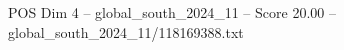 \begin{textsample}{POS Dim 4 – global\_south\_2024\_11 – Score 20.00 – global\_south\_2024\_11/118169388.txt}
\end{textsample}
